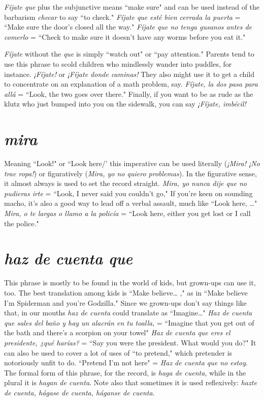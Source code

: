 \emph{Fíjate que} plus the subjunctive means ``make sure" and can be
used instead of the barbarism \emph{checar} to say ``to check." \emph{Fíjate que esté
bien cerrada la puerta} = ``Make sure the door's closed all the way."
\emph{Fíjate que no tenga gusanos antes de comerlo} = ``Check to make sure
it doesn't have any worms before you eat it."

\emph{Fíjate} without the \emph{que} is simply ``watch out" or ``pay attention." Parents tend to use this phrase to scold children who mindlessly
wander into puddles, for instance. \emph{¡Fíjate!} or \emph{¡Fíjate donde caminas!}
They also might use it to get a child to concentrate on an explanation
of a math problem, say. \emph{Fíjate, la dos pasa para allá} = ``Look, the two
goes over there." Finally, if you want to be as rude as the klutz who
just bumped into you on the sidewalk, you can say \emph{¡Fíjate, imbécil!}

\section{\emph{mira}}

Meaning ``Look!" or ``Look here/' this imperative can be used
literally (\emph{¡Mira! ¡No trae ropa!}) or figuratively (\emph{Mira, yo no quiero
problemas}). In the figurative sense, it almost always is used to set the
record straight. \emph{Mira, yo nunca dije que no pudieras irte} = ``Look,
I never said you couldn't go," If you're keen on sounding macho, it's
also a good way to lead off a verbal assault, much like ``Look here, \ldots{}"
\emph{Mira, o te largas o llamo a la policía} = ``Look here, either you get
lost or I call the police."

\section{\emph{haz de cuenta que}}

This phrase is mostly to be found in the world of kids, but
grown-ups can use it, too. The best translation among kids is ``Make
believe\ldots{} ," as in ``Make believe I'm Spiderman and you're Godzilla."
Since we grown-ups don't say things like that, in our mouths \emph{haz de
cuenta} could translate as ``Imagine\ldots{}" \emph{Haz de cuenta que sales del
baño y hay un alacrán en tu toalla}, = ``Imagine that you get out of the
bath and there's a scorpion on your towel" \emph{Haz de cuenta que eres el
presidente, ¿qué harías?} = ``Say you were the president. What would
you do?" It can also be used to cover a lot of uses of ``to pretend,"
which pretender is notoriously unfit to do. ``Pretend I'm not here" =
\emph{Haz de cuenta que no estoy}. The formal form of this phrase, for the
record, is \emph{haga de cuenta}, while in the plural it is \emph{hagan de cuenta}.
Note also that sometimes it is used reflexively: \emph{hazte de cuenta, hágase de cuenta, háganse de cuenta}.

